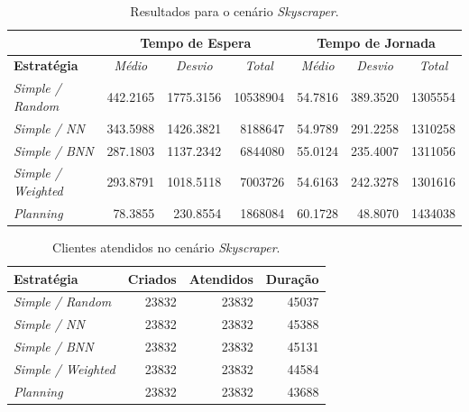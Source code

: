 \begin{table}[htb!]
\centering
\caption{Resultados para o cenário \textit{Skyscraper}.}
\label{tab:results:skyscraper}
\begin{tabular}{|l|r|r|r|r|r|r|}
\hline
\multicolumn{1}{|c|}{\textbf{}}                 & \multicolumn{3}{c|}{\textbf{Tempo de Espera}}                                                                    & \multicolumn{3}{c|}{\textbf{Tempo de Jornada}}                                                                                                                       \\ \hline
\textbf{Estratégia} & \multicolumn{1}{c|}{\textit{Médio}} & \multicolumn{1}{c|}{\textit{Desvio}} & \multicolumn{1}{c|}{\textit{Total}} & \multicolumn{1}{c|}{\textit{Médio}}                   & \multicolumn{1}{c|}{\textit{Desvio}}                  & \multicolumn{1}{c|}{\textit{Total}}                  \\ \hline
\textit{Simple / Random}          & 442.2165 & 1775.3156 & 10538904 & 54.7816 & 389.3520 & 1305554 \\ \hline
\textit{Simple / NN}              & 343.5988 & 1426.3821 &  8188647 & 54.9789 & 291.2258 & 1310258 \\ \hline
\textit{Simple / BNN}             & 287.1803 & 1137.2342 &  6844080 & 55.0124 & 235.4007 & 1311056 \\ \hline
\textit{Simple / Weighted}        & 293.8791 & 1018.5118 &  7003726 & \cellcolor[HTML]{67FD9A}54.6163 & 242.3278 & \cellcolor[HTML]{67FD9A}1301616 \\ \hline
\textit{Planning}                 &  \cellcolor[HTML]{67FD9A}78.3855 &  \cellcolor[HTML]{67FD9A}230.8554 &  \cellcolor[HTML]{67FD9A}1868084 & 60.1728 &  \cellcolor[HTML]{67FD9A}48.8070 & 1434038 \\ \hline
\end{tabular}
\end{table}

\begin{table}[htb]
\centering
\caption{Clientes atendidos no cenário \textit{Skyscraper}.}
\label{table:results:skyscraper:clients}
\begin{tabular}{|l|r|r|r|}
\hline
\textbf{Estratégia}        & \multicolumn{1}{l|}{\textbf{Criados}} & \multicolumn{1}{l|}{\textbf{Atendidos}} & \multicolumn{1}{l|}{\textbf{Duração}} \\ \hline
\textit{Simple / Random}   & 23832 & 23832 & 45037 \\ \hline
\textit{Simple / NN}       & 23832 & 23832 & 45388 \\ \hline
\textit{Simple / BNN}      & 23832 & 23832 & 45131 \\ \hline
\textit{Simple / Weighted} & 23832 & 23832 & 44584 \\ \hline
\textit{Planning}          & 23832 & 23832 & 43688 \\ \hline
\end{tabular}
\end{table}

